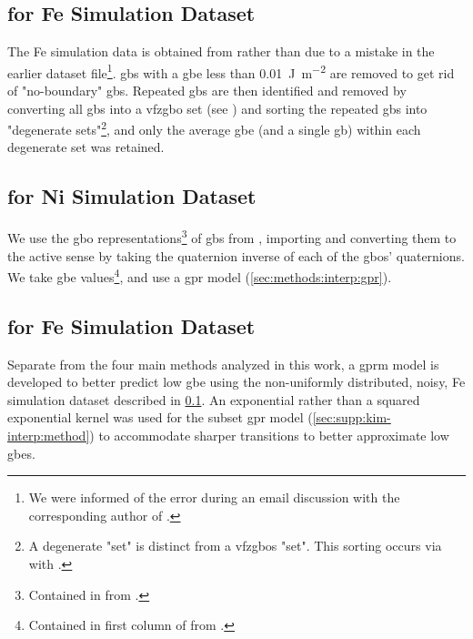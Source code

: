 \documentclass[preprint,12pt]{elsarticle}
\begin{document}
\subsection{ for Fe Simulation Dataset} %
\label{sec:methods:gprsim}
The Fe simulation data is obtained from \cite{kimPhasefieldModeling3D2014} rather than \cite{kimIdentificationSchemeGrain2011} due to a mistake in the earlier dataset file\footnote{We were informed of the error during an email discussion with the corresponding author of \cite{kimPhasefieldModeling3D2014}.}. \Glspl{gb} with a \gls{gbe} less than \SI{0.01}{\joule\per\square\meter} are removed to get rid of "no-boundary" \glspl{gb}. Repeated \glspl{gb} are then identified and removed by converting all \glspl{gb} into a \gls{vfzgbo} set (see ) and sorting the repeated \glspl{gb} into "degenerate sets"\footnote{A degenerate "set" is distinct from a \glspl{vfzgbo} "set". This sorting occurs via  with .}, and only the average \gls{gbe} (and a single \gls{gb}) within each degenerate set was retained. %

\subsection{ for Ni Simulation Dataset}
\label{sec:methods:gprsim-Ni}

We use the \gls{gbo} representations\footnote{Contained in  from \citet{chesserGBOctonionCode2019}. } \cite{chesserLearningGrainBoundary2020} of \glspl{gb} from \cite{olmstedSurveyComputedGrain2009}, importing and converting them to the active sense by taking the quaternion inverse of each of the \glspl{gbo}' quaternions. We take \gls{gbe} values\footnote{Contained in first column of  from  \citet{chesserGBOctonionCode2019}. }, and use a \gls{gpr} model (\cref{sec:methods:interp:gpr}).

\subsection{ for Fe Simulation Dataset}
\label{sec:methods:gprmix}
Separate from the four main methods analyzed in this work, a \gls{gprm} model is developed to better predict low \gls{gbe} using the non-uniformly distributed, noisy, Fe simulation dataset described in \cref{sec:methods:gprsim}. An exponential rather than a squared exponential kernel was used for the subset \gls{gpr} model (\cref{sec:supp:kim-interp:method}) to accommodate sharper transitions to better approximate low \glspl{gbe}.
\end{document}
